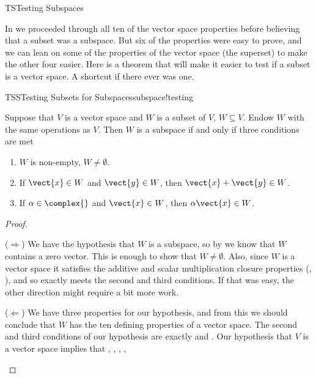 %
\begin{subsect}{TS}{Testing Subspaces}
%
\begin{para}In  we proceeded through all ten of the vector space properties before believing that a subset was a subspace.  But six of the properties were easy to prove, and we can lean on some of the properties of the vector space (the superset) to make the other four easier.  Here is a theorem that will make it easier to test if a subset is a vector space.  A shortcut if there ever was one.\end{para}
%
\begin{theorem}{TSS}{Testing Subsets for Subspaces}{subspace!testing}
\begin{para}Suppose that $V$ is a vector space and $W$ is a subset of $V$, $W\subseteq V$.  Endow $W$ with the same operations as $V$.  Then $W$ is a subspace if and only if three conditions are met
%
\begin{enumerate}
\item $W$ is non-empty, $W\neq\emptyset$.
\item If $\vect{x}\in W$ and $\vect{y}\in W$, then $\vect{x}+\vect{y}\in W$.
%
\item If $\alpha\in\complex{\null}$ and $\vect{x}\in W$, then $\alpha\vect{x}\in W$.
%
\end{enumerate}
\end{para}
\end{theorem}
%
\begin{proof}
\begin{para}($\Rightarrow$)  We have the hypothesis that $W$ is a subspace, so by  we know that $W$ contains a zero vector.  This is enough to show that $W\neq\emptyset$.  Also, since $W$ is a vector space it satisfies the additive and scalar multiplication closure properties (, ), and so exactly meets the second and third conditions.  If that was easy, the other direction might require a bit more work.\end{para}
%
\begin{para}($\Leftarrow$) We have three properties for our hypothesis, and from this we should conclude that $W$ has the ten defining properties of a vector space.  The second and third conditions of our hypothesis are exactly  and .
Our hypothesis that $V$ is a vector space implies that
,
,
,
,

\end{para}
\end{proof}
\end{subsect}

